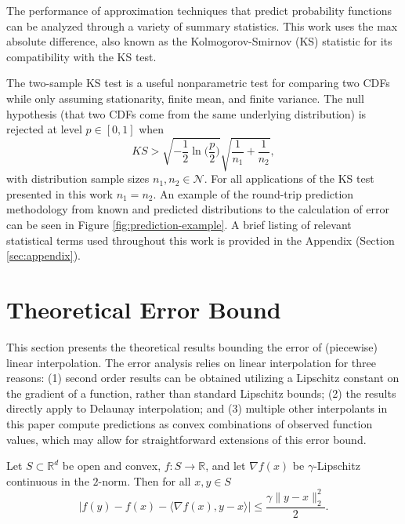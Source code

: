 \documentclass[smallextended,final]{svjour3}  %
\begin{document}
The performance of approximation techniques that predict probability
functions can be analyzed through a variety of summary
statistics. This work uses the max absolute difference, also known as
the Kolmogorov-Smirnov (KS) statistic \cite{lilliefors1967kolmogorov}
for its compatibility with the KS test.

The two-sample KS test is a useful nonparametric test for comparing
two CDFs while only assuming stationarity, finite mean, and finite
variance. The null hypothesis (that two CDFs come from the same
underlying distribution) is rejected at level $p \in [0,1]$ when
 $$ KS > \sqrt{-\frac{1}{2}\ln\biggl(\frac{p}{2}\biggr)} \sqrt{\frac{1}{n_1} + \frac{1}{n_2}}, $$
with distribution sample sizes $n_1,n_2 \in \mathcal{N}$. For all
applications of the KS test presented in this work $n_1 = n_2$. An
example of the round-trip prediction methodology from known and
predicted distributions to the calculation of error can be seen in
Figure \ref{fig:prediction-example}. A brief listing of relevant
statistical terms used throughout this work is provided in
the Appendix (Section \ref{sec:appendix}).

\section{Theoretical Error Bound}
\label{sec:theory}

This section presents the theoretical results bounding the error of
(piecewise) linear interpolation. The error analysis relies on linear
interpolation for three reasons: (1) second order results can be
obtained utilizing a Lipschitz constant on the gradient of a function,
rather than standard Lipschitz bounds; (2) the results directly apply
to Delaunay interpolation; and (3) multiple other interpolants in this
paper compute predictions as convex combinations of observed function
values, which may allow for straightforward extensions of this error
bound.

\begin{plainlemma}
  \label{lemma:1}
  Let $S \subset \mathbb{R}^d$ be open and convex, $f: S \rightarrow
  \mathbb{R}$, and let $\nabla f(x)$ be $\gamma$-Lipschitz continuous
  in the $2$-norm. Then for all $x,y \in S$
  $$\big|f(y) - f(x) - \langle \nabla f(x), y - x \rangle \big| \leq \frac{\gamma \|y - x\|_2^2}{2}.$$
\end{plainlemma}
\end{document}
